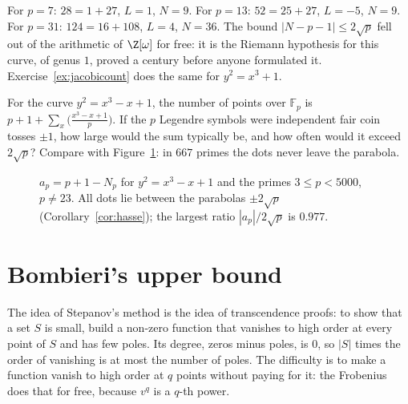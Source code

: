For $p=7$: $28=1+27$, $L=1$, $N=9$. For $p=13$: $52=25+27$, $L=-5$, $N=9$. For $p=31$: $124=16+108$, $L=4$, $N=36$. The bound $|N-p-1|\le2\sqrt p$ fell out
of the arithmetic of $\Z[\omega]$ for free: it is the Riemann hypothesis for this curve, of genus $1$, proved a century before anyone formulated it. Exercise~\ref{ex:jacobicount}
does the same for $y^2=x^3+1$.

\begin{think}
For the curve $y^2=x^3-x+1$, the number of points over $\mathbb F_p$ is $p+1+\sum_x\bigl(\frac{x^3-x+1}p\bigr)$. If the $p$ Legendre symbols were independent fair
coin tosses $\pm1$, how large would the sum typically be, and how often would it exceed $2\sqrt p$? Compare with Figure~\ref{fig:hasse}: in $667$ primes the
dots never leave the parabola.
\end{think}

\begin{figure}[ht]
\centering{}
\caption{$a_p=p+1-N_p$ for $y^2=x^3-x+1$ and the primes $3\le p<5000$, $p\ne23$. All dots lie between the parabolas $\pm2\sqrt p$ (Corollary~\ref{cor:hasse}); the largest
ratio $|a_p|/2\sqrt p$ is $0.977$.}
\label{fig:hasse}
\end{figure}

\section{Bombieri's upper bound}

The idea of Stepanov's method is the idea of transcendence proofs: to show that a set $S$ is small, build a non-zero function that vanishes to high order at every
point of $S$ and has few poles. Its degree, zeros minus poles, is $0$, so $|S|$ times the order of vanishing is at most the number of poles. The difficulty is to
make a function vanish to high order at $q$ points without paying for it: the Frobenius does that for free, because $v^q$ is a $q$-th power.

